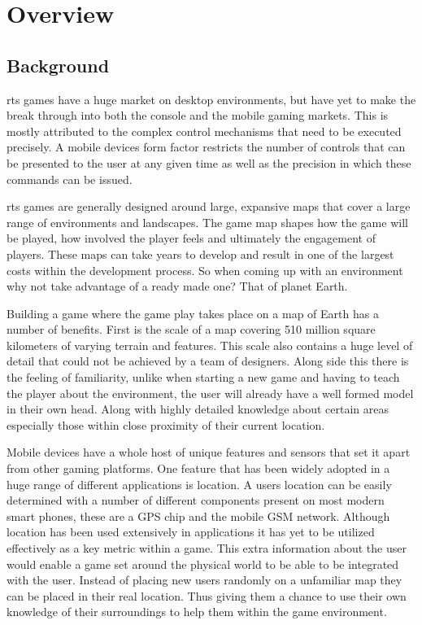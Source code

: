\chapter{Overview}

\section{Background}
\Gls{rts} games have a huge market on desktop environments, but have yet to make the break through into both the console and the mobile gaming markets. This is mostly attributed to the complex control mechanisms that need to be executed precisely. A mobile devices form factor restricts the number of controls that can be presented to the user at any given time as well as the precision in which these commands can be issued.

\Gls{rts} games are generally designed around large, expansive maps that cover a large range of environments and landscapes. The game map shapes how the game will be played, how involved the player feels and ultimately the engagement of players. These maps can take years to develop and result in one of the largest costs within the development process. So when coming up with an environment why not take advantage of a ready made one? That of planet Earth.

Building a game where the game play takes place on a map of Earth has a number of benefits. First is the scale of a map covering 510 million square kilometers of varying terrain and features. This scale also contains a huge level of detail that could not be achieved by a team of designers. Along side this there is the feeling of familiarity, unlike when starting a new game and having to teach the player about the environment, the user will already have a well formed model in their own head. Along with highly detailed knowledge about certain areas especially those within close proximity of their current location.

Mobile devices have a whole host of unique features and sensors that set it apart from other gaming platforms. One feature that has been widely adopted in a huge range of different applications is location. A users location can be easily determined with a number of different components present on most modern smart phones, these are a GPS chip and the mobile GSM network. Although location has been used extensively in applications it has yet to be utilized effectively as a key metric within a game. This extra information about the user would enable a game set around the physical world to be able to be integrated with the user. Instead of placing new users randomly on a unfamiliar map they can be placed in their real location. Thus giving them a chance to use their own knowledge of their surroundings to help them within the game environment.


